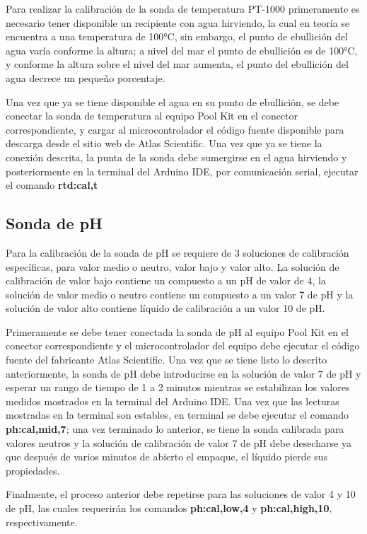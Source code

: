 Para realizar la calibración de la sonda de temperatura PT-1000 primeramente es necesario tener disponible un recipiente con agua hirviendo, la cual en teoría se encuentra a una temperatura de 100°C, sin embargo, el punto 
de ebullición del agua varía conforme la altura; a nivel del mar el punto de ebullición es de 100°C, y conforme la altura sobre el nivel del mar aumenta, el punto del ebullición del agua decrece un pequeño porcentaje.

Una vez que ya se tiene disponible el agua en su punto de ebullición, se debe conectar la sonda de temperatura al equipo Pool Kit en el conector correspondiente, y cargar al microcontrolador el código fuente disponible para 
descarga desde el sitio web de Atlas Scientific. Una vez que ya se tiene la conexión descrita, la punta de la sonda debe sumergirse en el agua hirviendo y posteriormente en la terminal del Arduino IDE, por comunicación serial, ejecutar el comando 
\textbf{rtd:cal,t}

\subsection{Sonda de pH}

Para la calibración de la sonda de pH se requiere de 3 soluciones de calibración específicas, para valor medio o neutro, valor bajo y valor alto. La solución de calibración de valor bajo contiene un compuesto a un pH de 
valor de 4, la solución de valor medio o neutro contiene un compuesto a un valor 7 de pH y la solución de valor alto contiene líquido de calibración a un valor 10 de pH.

Primeramente se debe tener conectada la sonda de pH al equipo Pool Kit en el conector correspondiente y el microcontrolador del equipo debe ejecutar el código fuente del fabricante Atlas Scientific. Una vez que se tiene 
listo lo descrito anteriormente, la sonda de pH debe introducirse en la solución de valor 7 de pH y esperar un rango de tiempo de 1 a 2 minutos mientras se estabilizan los valores medidos mostrados en la terminal del Arduino
IDE. Una vez que las lecturas mostradas en la terminal son estables, en terminal se debe ejecutar el comando \textbf{ph:cal,mid,7}; una vez terminado lo anterior, se tiene la sonda calibrada para valores neutros y la solución 
de calibración de valor 7 de pH debe desecharse ya que después de varios minutos de abierto el empaque, el líquido pierde sus propiedades. 

Finalmente, el proceso anterior debe repetirse para las soluciones de valor 4 y 10 de pH, las cuales requerirán los comandos \textbf{ph:cal,low,4} y \textbf{ph:cal,high,10}, respectivamente.

